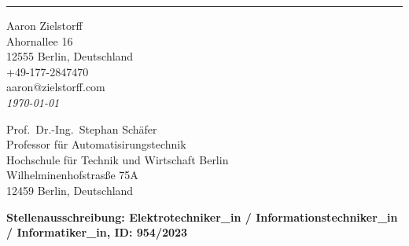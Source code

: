 \documentclass[
	12pt, %
]{letter}
\begin{document}

\vspace*{-1.25cm} %


\vspace{-0.5cm} %

\rule{\linewidth}{1pt} %

\medskip %


\begingroup
	\raggedleft %
	\small %
	Aaron Zielstorff \\ %
	Ahornallee 16 \\ %
	12555 Berlin, Deutschland \\
	+49-177-2847470 \\ %
	aaron@zielstorff.com\\ %
	\bigskip %
	{\normalsize\textit{\today}}\\ %
\endgroup


\begingroup
	Prof.\ Dr.-Ing.\ Stephan Schäfer \\
	Professor für Automatisirungstechnik \\
	Hochschule für Technik und Wirtschaft Berlin \\
	Wilhelminenhofstrasße 75A \\
	12459 Berlin, Deutschland
\endgroup

\bigskip %

\textbf{Stellenausschreibung: Elektrotechniker\_in / Informationstechniker\_in / Informatiker\_in, ID: 954/2023}

\medskip %
\end{document}
